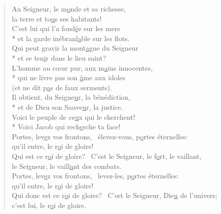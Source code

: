 
\begin{verse}
Au Seigneur, le m\underline{o}nde et sa richesse, \\
la terre et to\underline{u}s ses habitants! \\
C’est lui qui l’a fond\underline{é}e sur les mers \\*
et la garde inébranl\underline{a}ble sur les flots. \\

Qui peut gravir la mont\underline{a}gne du Seigneur \\*
et se ten\underline{i}r dans le lieu saint? \\
L’homme au cœur pur, aux m\underline{a}ins innocentes, \\*
qui ne livre pas son \underline{â}me aux idoles \\
(et ne dit p\underline{a}s de faux serments). \\

Il obtient, du Seigne\underline{u}r, la bénédiction, \\*
et de Dieu son Sauve\underline{u}r, la justice. \\
Voici le peuple de ce\underline{u}x qui le cherchent! \\*
Voici Jacob qui rech\underline{e}rche ta face! \\

Portes, lev\underline{e}z vos frontons,~\psalmdagger
élevez-vous, p\underline{o}rtes éternelles: \\
qu’il entre, le r\underline{o}i de gloire! \\

Qui est ce r\underline{o}i de gloire?~\psalmdagger
C’est le Seigneur, le f\underline{o}rt, le vaillant, \\
le Seigneur, le vaill\underline{a}nt des combats. \\

Portes, lev\underline{e}z vos frontons,~\psalmdagger
levez-les, p\underline{o}rtes éternelles: \\
qu’il entre, le r\underline{o}i de gloire! \\

Qui donc est ce r\underline{o}i de gloire?~\psalmdagger
C’est le Seigneur, Die\underline{u} de l’univers; \\
c’est lui, le r\underline{o}i de gloire. \\
\end{verse}


